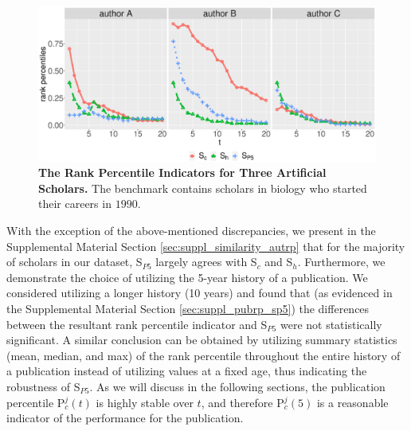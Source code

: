 \begin{figure}[!ht]
    \centering
    \includegraphics[width=\textwidth]{figures/compare_autrp/simulated_authors.eps}
    \caption{{\bf The Rank Percentile Indicators for Three Artificial Scholars.} The benchmark contains scholars in biology who started their careers in $1990$.}
    \label{fig:simulated_authors}
\end{figure}

With the exception of the above-mentioned discrepancies, we present in the Supplemental Material Section \ref{sec:suppl_similarity_autrp} that for the majority of scholars in our dataset, S$_{P5}$ largely agrees with S$_c$ and S$_h$. Furthermore, we demonstrate the choice of utilizing the 5-year history of a publication. We considered utilizing a longer history (10 years) and found that (as evidenced in the Supplemental Material Section \ref{sec:suppl_pubrp_sp5}) the differences between the resultant rank percentile indicator and S$_{P5}$ were not statistically significant. A similar conclusion can be obtained by utilizing summary statistics (mean, median, and max) of the rank percentile throughout the entire history of a publication instead of utilizing values at a fixed age, thus indicating the robustness of S$_{P5}$. As we will discuss in the following sections, the publication percentile P$_c^{j}(t)$ is highly stable over $t$, and therefore P$_c^{j}(5)$ is a reasonable indicator of the performance for the publication. 

